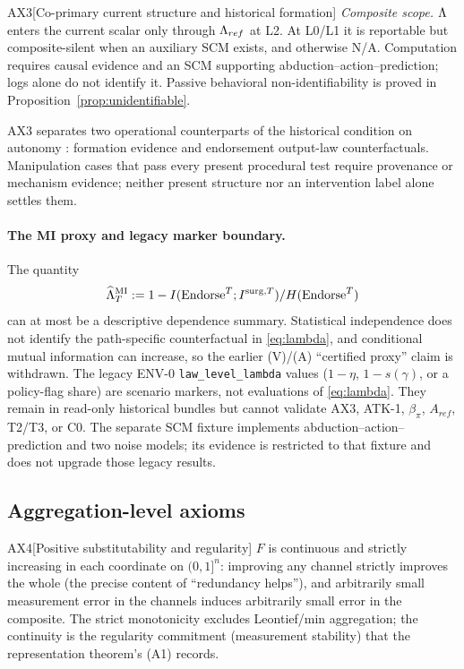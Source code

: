 \begin{axiom}{AX3}[Co-primary current structure and historical formation]
\emph{Composite scope.} $\Lambda$ enters the current scalar only through
$\Lambda_{ref}$ at L2. At L0/L1 it is reportable but composite-silent when an
auxiliary SCM exists, and otherwise N/A. Computation requires causal evidence
and an SCM supporting abduction--action--prediction; logs alone do not identify
it. Passive behavioral non-identifiability is proved in
Proposition~\ref{prop:unidentifiable}.
\end{axiom}

AX3 separates two operational counterparts of the historical condition on
autonomy \citep{fischer_ravizza1998}: formation evidence and endorsement
output-law counterfactuals. Manipulation cases that pass every present
procedural test require provenance or mechanism evidence; neither present
structure nor an intervention label alone settles them.

\paragraph{The MI proxy and legacy marker boundary.}
The quantity
\[
\widehat{\Lambda}^{\mathrm{MI}}_T:=1-I(\mathrm{Endorse}^T;I^{\mathrm{surg},T})/H(\mathrm{Endorse}^T)
\]
can at most be a descriptive dependence summary. Statistical independence does not identify
the path-specific counterfactual in \eqref{eq:lambda}, and conditional mutual
information can increase, so the earlier (V)/(A) ``certified proxy'' claim is
withdrawn. The legacy ENV-0 \texttt{law\_level\_lambda} values ($1-\eta$,
$1-s(\gamma)$, or a policy-flag share) are scenario markers, not evaluations
of \eqref{eq:lambda}. They remain in read-only historical bundles but cannot
validate AX3, ATK-1, $\beta_\pi$, $A_{ref}$, T2/T3, or C0. The separate
SCM fixture implements abduction--action--prediction and two noise models;
its evidence is restricted to that fixture and does not upgrade those legacy
results.

\subsection{Aggregation-level axioms}

\begin{axiom}{AX4}[Positive substitutability and regularity]\label{ax:4}
$F$ is continuous and strictly increasing in each coordinate on $(0,1]^n$:
improving any channel strictly improves the whole (the precise content of
``redundancy helps''), and arbitrarily small measurement error in the
channels induces arbitrarily small error in the composite. The strict
monotonicity excludes Leontief/min aggregation; the continuity is the
regularity commitment (measurement stability) that the representation
theorem's (A1) records.
\end{axiom}

